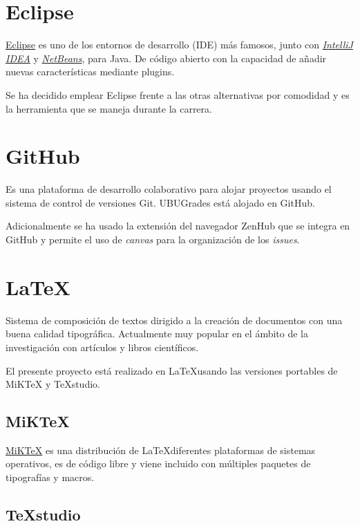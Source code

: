 \section{Eclipse}

\href{https://www.eclipse.org/}{Eclipse} es uno de los entornos de desarrollo (IDE) más famosos, junto con
\href{https://www.jetbrains.com}{\textit{IntelliJ IDEA}} y \href{https://netbeans.org/}{\textit{NetBeans}}, para Java. De código abierto con la capacidad de añadir nuevas características mediante plugins.

Se ha decidido emplear Eclipse frente a las otras alternativas por comodidad y es la herramienta que se maneja durante la carrera.


\section{GitHub}
Es una plataforma de desarrollo colaborativo para alojar proyectos usando el sistema de control de versiones Git. UBUGrades está alojado en GitHub.

Adicionalmente se ha usado la extensión del navegador ZenHub que se integra en GitHub y permite el uso de \textit{canvas} para la organización de los \textit{issues}.


\section{LaTeX}

Sistema de composición de textos dirigido a la creación de documentos con una buena calidad tipográfica. Actualmente muy popular en el ámbito de la investigación con artículos y libros científicos.

El presente proyecto está realizado en \LaTeX usando las versiones portables de MiKTeX y TeXstudio. 

\subsection{MiKTeX}

\href{https://miktex.org/}{MiKTeX} es una distribución de \LaTeX diferentes plataformas de sistemas operativos, es de código libre y viene incluido con múltiples paquetes de tipografías y macros.

\subsection{TeXstudio}

